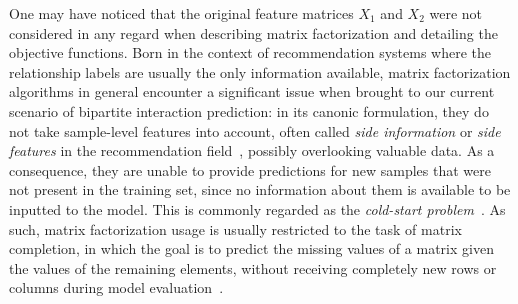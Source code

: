 % 

One may have noticed that the original feature matrices $X_1$ and $X_2$ were not considered in any regard when describing matrix factorization and detailing the objective functions.
Born in the context of recommendation systems where the relationship labels are usually the only information available, matrix factorization algorithms in general encounter a significant issue when brought to our current scenario of bipartite interaction prediction:
in its canonic formulation, they do not take sample-level features into account, often called \emph{side information} or \emph{side features} in the recommendation field~\cite{}, possibly overlooking valuable data. As a consequence, they are unable to provide predictions for new samples that were not present in the training set, since no information about them is available to be inputted to the model. This is commonly regarded as the \emph{cold-start problem}~\cite{}. As such, matrix factorization usage is usually restricted to the task of matrix completion, in which the goal is to predict the missing values of a matrix given the values of the remaining elements, without receiving completely new rows or columns during model evaluation~\cite{}.

